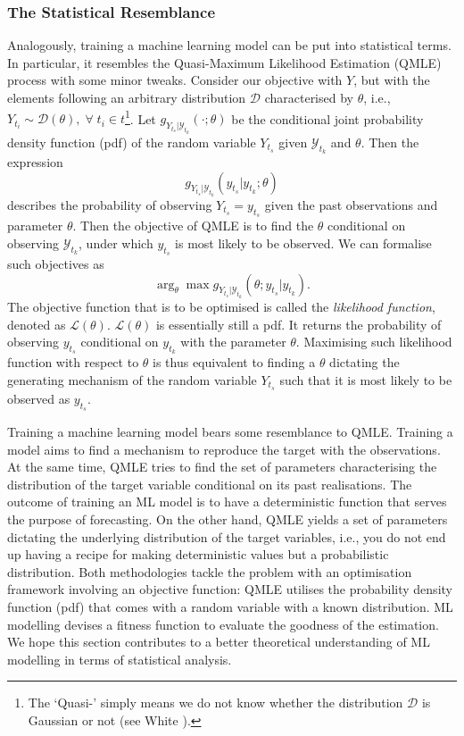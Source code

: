 \subsubsection{The Statistical Resemblance}
Analogously, training a machine learning model can be put into statistical terms. In particular, it resembles the Quasi-Maximum Likelihood Estimation (QMLE) process with some minor tweaks. Consider our objective with $Y$, but with the elements following an arbitrary distribution $\mathcal{D}$ characterised by $\theta$, i.e., $Y_{t_i} \sim \mathcal{D}(\theta), \; \forall \; t_i \in t$\footnote{The `Quasi-' simply means we do not know whether the distribution $\mathcal{D}$ is Gaussian or not (see White \citeyear{white1982maximum}).}. Let $g_{Y_{t_s} | \mathcal{Y}_{t_k}}(\cdot; \theta)$ be the conditional joint probability density function (pdf) of the random variable $Y_{t_s}$ given $\mathcal{Y}_{t_k}$ and $\theta$. Then the expression
\begin{equation*}
    g_{Y_{t_s} | \mathcal{Y}_{t_k}}(y_{t_s}| y_{t_k} ; \theta)
\end{equation*}
describes the probability of observing $Y_{t_s} = y_{t_s}$ given the past observations and parameter $\theta$. Then the objective of QMLE is to find the $\theta$ conditional on observing $\mathcal{Y}_{t_k}$, under which $y_{t_s}$ is most likely to be observed. We can formalise such objectives as
\begin{equation*}
    \arg_{\theta} \max g_{Y_{t_s} | \mathcal{Y}_{t_k}}(\theta ; y_{t_s} | y_{t_k}).
\end{equation*}
The objective function that is to be optimised is called the \textit{likelihood function}, denoted as $\mathcal{L}(\theta)$. $\mathcal{L}(\theta)$ is essentially still a pdf. It returns the probability of observing $y_{t_s}$ conditional on $y_{t_k}$ with the parameter $\theta$. Maximising such likelihood function with respect to $\theta$ is thus equivalent to finding a $\theta$ dictating the generating mechanism of the random variable $Y_{t_s}$ such that it is most likely to be observed as $y_{t_s}$.

Training a machine learning model bears some resemblance to QMLE. Training a model aims to find a mechanism to reproduce the target with the observations. At the same time, QMLE tries to find the set of parameters characterising the distribution of the target variable conditional on its past realisations. The outcome of training an ML model is to have a deterministic function that serves the purpose of forecasting. On the other hand, QMLE yields a set of parameters dictating the underlying distribution of the target variables, i.e., you do not end up having a recipe for making deterministic values but a probabilistic distribution. Both methodologies tackle the problem with an optimisation framework involving an objective function: QMLE utilises the probability density function (pdf) that comes with a random variable with a known distribution. ML modelling devises a fitness function to evaluate the goodness of the estimation. We hope this section contributes to a better theoretical understanding of ML modelling in terms of statistical analysis.

